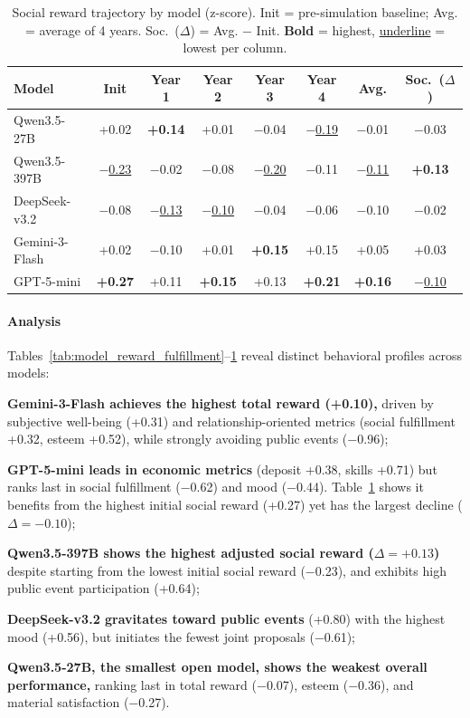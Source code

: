 \begin{table}[t]
\centering
\caption{Social reward trajectory by model (z-score).
Init = pre-simulation baseline; Avg. = average of 4 years. Soc.~($\Delta$) = Avg. $-$ Init.
\textbf{Bold} = highest, \underline{underline} = lowest per column.}
\label{tab:social_trajectory}
\begin{tabular}{l c c c c c c c}
\toprule
\textbf{Model} & Init & Year 1 & Year 2 & Year 3 & Year 4 & Avg. & Soc.~($\Delta$) \\
\midrule
Qwen3.5-27B      & +0.02 & \textbf{+0.14} & +0.01 & $-$0.04 & \underline{$-$0.19} & $-$0.01 & $-$0.03 \\
Qwen3.5-397B     & \underline{$-$0.23} & $-$0.02 & $-$0.08 & \underline{$-$0.20} & $-$0.11 & \underline{$-$0.11} & \textbf{+0.13} \\
DeepSeek-v3.2    & $-$0.08 & \underline{$-$0.13} & \underline{$-$0.10} & $-$0.04 & $-$0.06 & $-$0.10 & $-$0.02 \\
Gemini-3-Flash   & +0.02 & $-$0.10 & +0.01 & \textbf{+0.15} & +0.15 & +0.05 & +0.03 \\
GPT-5-mini       & \textbf{+0.27} & +0.11 & \textbf{+0.15} & +0.13 & \textbf{+0.21} & \textbf{+0.16} & \underline{$-$0.10} \\
\bottomrule
\end{tabular}
\end{table}

\paragraph{Analysis}
Tables~\ref{tab:model_reward_fulfillment}--\ref{tab:social_trajectory}
reveal distinct behavioral profiles across models:
\begin{inparaenum}[\it (1)]
\item \textbf{Gemini-3-Flash achieves the highest total reward (+0.10),}
driven by subjective well-being (+0.31) and relationship-oriented metrics
(social fulfillment +0.32, esteem +0.52),
while strongly avoiding public events ($-$0.96);
\item \textbf{GPT-5-mini leads in economic metrics}
(deposit +0.38, skills +0.71)
but ranks last in social fulfillment ($-$0.62) and mood ($-$0.44).
Table~\ref{tab:social_trajectory} shows it benefits from
the highest initial social reward (+0.27) yet has
the largest decline ($\Delta = -0.10$);
\item \textbf{Qwen3.5-397B shows the highest adjusted social reward ($\Delta = +0.13$)}
despite starting from the lowest initial social reward ($-$0.23),
and exhibits high public event participation (+0.64);
\item \textbf{DeepSeek-v3.2 gravitates toward public events} (+0.80)
with the highest mood (+0.56),
but initiates the fewest joint proposals ($-$0.61);
\item \textbf{Qwen3.5-27B, the smallest open model, shows the weakest overall performance,}
ranking last in total reward ($-$0.07),
esteem ($-$0.36), and material satisfaction ($-$0.27).
\end{inparaenum}

